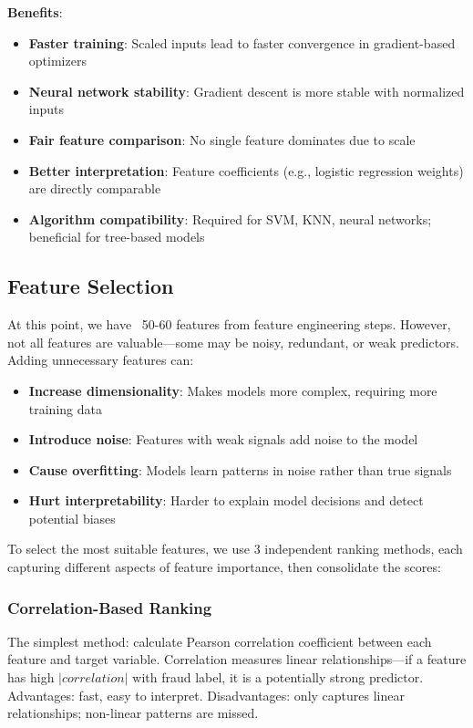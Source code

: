 \textbf{Benefits}:
\begin{itemize}
    \item \textbf{Faster training}: Scaled inputs lead to faster convergence in gradient-based optimizers
    \item \textbf{Neural network stability}: Gradient descent is more stable with normalized inputs
    \item \textbf{Fair feature comparison}: No single feature dominates due to scale
    \item \textbf{Better interpretation}: Feature coefficients (e.g., logistic regression weights) are directly comparable
    \item \textbf{Algorithm compatibility}: Required for SVM, KNN, neural networks; beneficial for tree-based models
\end{itemize}

\subsection{Feature Selection}

At this point, we have ~50-60 features from feature engineering steps. However, not all features are valuable---some may be noisy, redundant, or weak predictors. Adding unnecessary features can:
\begin{itemize}
    \item \textbf{Increase dimensionality}: Makes models more complex, requiring more training data
    \item \textbf{Introduce noise}: Features with weak signals add noise to the model
    \item \textbf{Cause overfitting}: Models learn patterns in noise rather than true signals
    \item \textbf{Hurt interpretability}: Harder to explain model decisions and detect potential biases
\end{itemize}

To select the most suitable features, we use 3 independent ranking methods, each capturing different aspects of feature importance, then consolidate the scores:

\subsubsection{Correlation-Based Ranking}
The simplest method: calculate Pearson correlation coefficient between each feature and target variable. Correlation measures linear relationships---if a feature has high $|correlation|$ with fraud label, it is a potentially strong predictor. Advantages: fast, easy to interpret. Disadvantages: only captures linear relationships; non-linear patterns are missed.


